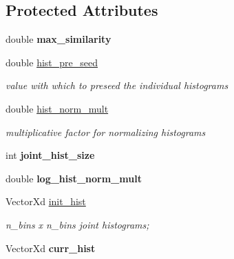 \subsection*{Protected Attributes}
\begin{DoxyCompactItemize}
\item 
\hypertarget{classCCRE_a546c521ce21bb460cfbba80216735a5b}{double {\bfseries max\-\_\-similarity}}\label{classCCRE_a546c521ce21bb460cfbba80216735a5b}

\item 
\hypertarget{classCCRE_ac4c475d6fec27db6f8522da1e803443a}{double \hyperlink{classCCRE_ac4c475d6fec27db6f8522da1e803443a}{hist\-\_\-pre\-\_\-seed}}\label{classCCRE_ac4c475d6fec27db6f8522da1e803443a}

\begin{DoxyCompactList}\small\item\em value with which to preseed the individual histograms \end{DoxyCompactList}\item 
\hypertarget{classCCRE_afc96a1d02a189c32d3ef78cf79c4dae5}{double \hyperlink{classCCRE_afc96a1d02a189c32d3ef78cf79c4dae5}{hist\-\_\-norm\-\_\-mult}}\label{classCCRE_afc96a1d02a189c32d3ef78cf79c4dae5}

\begin{DoxyCompactList}\small\item\em multiplicative factor for normalizing histograms \end{DoxyCompactList}\item 
\hypertarget{classCCRE_aa0a39232ee88f1526e5404c0fdf8495a}{int {\bfseries joint\-\_\-hist\-\_\-size}}\label{classCCRE_aa0a39232ee88f1526e5404c0fdf8495a}

\item 
\hypertarget{classCCRE_a4277fca9c76ece7b115f2233d9147ed4}{double {\bfseries log\-\_\-hist\-\_\-norm\-\_\-mult}}\label{classCCRE_a4277fca9c76ece7b115f2233d9147ed4}

\item 
\hypertarget{classCCRE_a33d8fc22570e6953bb3a354e208a1f02}{Vector\-Xd \hyperlink{classCCRE_a33d8fc22570e6953bb3a354e208a1f02}{init\-\_\-hist}}\label{classCCRE_a33d8fc22570e6953bb3a354e208a1f02}

\begin{DoxyCompactList}\small\item\em n\-\_\-bins x n\-\_\-bins joint histograms; \end{DoxyCompactList}\item 
\hypertarget{classCCRE_a4e9702f1e4d81f0ed0190b2062d2bfcc}{Vector\-Xd {\bfseries curr\-\_\-hist}}\label{classCCRE_a4e9702f1e4d81f0ed0190b2062d2bfcc}


\end{DoxyCompactItemize}
